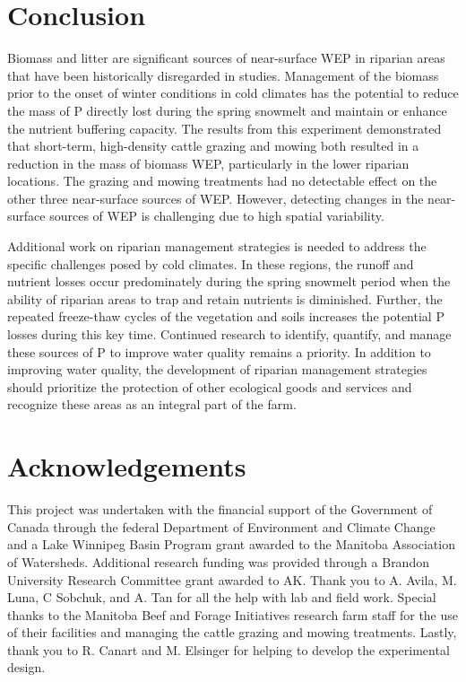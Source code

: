 \documentclass[
]{agujournal2019}
\begin{document}
\section{Conclusion}\label{conclusion}

Biomass and litter are significant sources of near-surface WEP in
riparian areas that have been historically disregarded in studies.
Management of the biomass prior to the onset of winter conditions in
cold climates has the potential to reduce the mass of P directly lost
during the spring snowmelt and maintain or enhance the nutrient
buffering capacity. The results from this experiment demonstrated that
short-term, high-density cattle grazing and mowing both resulted in a
reduction in the mass of biomass WEP, particularly in the lower riparian
locations. The grazing and mowing treatments had no detectable effect on
the other three near-surface sources of WEP. However, detecting changes
in the near-surface sources of WEP is challenging due to high spatial
variability.

Additional work on riparian management strategies is needed to address
the specific challenges posed by cold climates. In these regions, the
runoff and nutrient losses occur predominately during the spring
snowmelt period when the ability of riparian areas to trap and retain
nutrients is diminished. Further, the repeated freeze-thaw cycles of the
vegetation and soils increases the potential P losses during this key
time. Continued research to identify, quantify, and manage these sources
of P to improve water quality remains a priority. In addition to
improving water quality, the development of riparian management
strategies should prioritize the protection of other ecological goods
and services and recognize these areas as an integral part of the farm.

\section*{Acknowledgements}\label{acknowledgements}

This project was undertaken with the financial support of the Government
of Canada through the federal Department of Environment and Climate
Change and a Lake Winnipeg Basin Program grant awarded to the Manitoba
Association of Watersheds. Additional research funding was provided
through a Brandon University Research Committee grant awarded to AK.
Thank you to A. Avila, M. Luna, C Sobchuk, and A. Tan for all the help
with lab and field work. Special thanks to the Manitoba Beef and Forage
Initiatives research farm staff for the use of their facilities and
managing the cattle grazing and mowing treatments. Lastly, thank you to
R. Canart and M. Elsinger for helping to develop the experimental
design.
\end{document}
